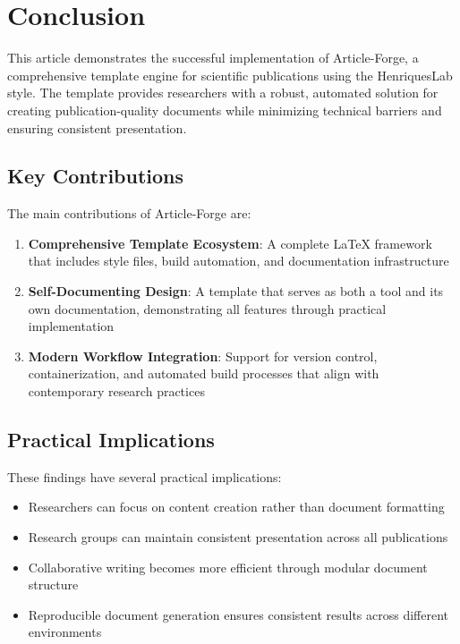 \section{Conclusion}

This article demonstrates the successful implementation of Article-Forge, a comprehensive template engine for scientific publications using the HenriquesLab style. The template provides researchers with a robust, automated solution for creating publication-quality documents while minimizing technical barriers and ensuring consistent presentation.

\subsection{Key Contributions}

The main contributions of Article-Forge are:

\begin{enumerate}
    \item \textbf{Comprehensive Template Ecosystem}: A complete LaTeX framework that includes style files, build automation, and documentation infrastructure
    \item \textbf{Self-Documenting Design}: A template that serves as both a tool and its own documentation, demonstrating all features through practical implementation
    \item \textbf{Modern Workflow Integration}: Support for version control, containerization, and automated build processes that align with contemporary research practices
\end{enumerate}

\subsection{Practical Implications}

These findings have several practical implications:
\begin{itemize}
    \item Researchers can focus on content creation rather than document formatting
    \item Research groups can maintain consistent presentation across all publications
    \item Collaborative writing becomes more efficient through modular document structure
    \item Reproducible document generation ensures consistent results across different environments
\end{itemize}

